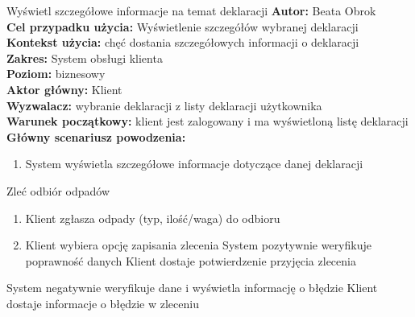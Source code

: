 	\begin{usecase}{Wyświetl szczegółowe informacje na temat deklaracji}
		\textbf{Autor:} Beata Obrok \\
		\textbf{Cel przypadku użycia:} Wyświetlenie szczegółów wybranej deklaracji \\
		\textbf{Kontekst użycia:} chęć dostania szczegółowych informacji o deklaracji\\
		\textbf{Zakres:} System obsługi klienta \\
		\textbf{Poziom:} biznesowy \\
		\textbf{Aktor główny:} Klient\\
		\textbf{Wyzwalacz:} wybranie deklaracji z listy deklaracji użytkownika \\
		\textbf{Warunek początkowy:} klient jest zalogowany i ma wyświetloną listę deklaracji\\
		\textbf{Główny scenariusz powodzenia:} \\
			\begin{enumerate}
				\item System wyświetla szczegółowe informacje dotyczące danej deklaracji
			\end{enumerate}
	\end{usecase}

	

	\begin{usecase}{Zleć odbiór odpadów}
		\author{Dawid Suder}
		\maketitle
		\begin{scenario}
			\begin{enumerate}
				\item Klient zgłasza odpady (typ, ilość/waga) do odbioru
				\item Klient wybiera opcję zapisania zlecenia
				 System pozytywnie weryfikuje poprawność danych
				 Klient dostaje potwierdzenie przyjęcia zlecenia
			\end{enumerate}
		\end{scenario}
		\begin{extensions}
			\begin{enumerate}
				 System negatywnie weryfikuje dane i wyświetla informację o błędzie
				 Klient dostaje informacje o błędzie w zleceniu
			\end{enumerate}
		\end{extensions}
	\end{usecase}

